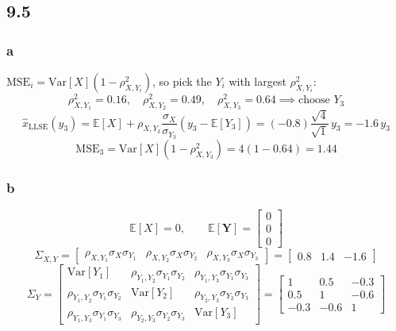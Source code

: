 \documentclass{article}
\newcommand{\mat}[1]{\begin{bmatrix}#1\end{bmatrix}}
\newcommand{\vect}[1]{\begin{bmatrix}#1\end{bmatrix}}
\newcommand{\E}[1]{\mathbb{E}\!\left[#1\right]}
\newcommand{\Var}[1]{\mathrm{Var}\!\left[#1\right]}
\begin{document}
\subsection*{9.5}

\subsubsection*{a}
$\text{MSE}_i = \Var{X}(1 - \rho_{X,Y_i}^2)$, so pick the $Y_i$ with largest $\rho_{X,Y_i}^2$:
\[
\rho_{X,Y_1}^2 = 0.16,\quad \rho_{X,Y_2}^2 = 0.49,\quad \rho_{X,Y_3}^2 = 0.64 \implies \text{choose } Y_3
\]
\[
\hat{x}_\text{LLSE}(y_3) = \E{X} + \rho_{X,Y_3}\frac{\sigma_X}{\sigma_{Y_3}}(y_3 - \E{Y_3})
= (-0.8)\frac{\sqrt{4}}{\sqrt{1}}\,y_3 = -1.6\,y_3
\]
\[
\text{MSE}_3 = \Var{X}(1 - \rho_{X,Y_3}^2) = 4(1 - 0.64) = 1.44
\]

\subsubsection*{b}
\[
\E{X} = 0,\qquad
\E{\mathbf{Y}} = \vect{0\\0\\0}
\]
\[
\Sigma_{X,Y} = \begin{bmatrix} \rho_{X,Y_1}\sigma_X\sigma_{Y_1} & \rho_{X,Y_2}\sigma_X\sigma_{Y_2} & \rho_{X,Y_3}\sigma_X\sigma_{Y_3} \end{bmatrix}
= \begin{bmatrix} 0.8 & 1.4 & -1.6 \end{bmatrix}
\]
\[
\Sigma_Y =
\mat{
\Var{Y_1} & \rho_{Y_1,Y_2}\sigma_{Y_1}\sigma_{Y_2} & \rho_{Y_1,Y_3}\sigma_{Y_1}\sigma_{Y_3} \\
\rho_{Y_1,Y_2}\sigma_{Y_1}\sigma_{Y_2} & \Var{Y_2} & \rho_{Y_2,Y_3}\sigma_{Y_2}\sigma_{Y_3} \\
\rho_{Y_1,Y_3}\sigma_{Y_1}\sigma_{Y_3} & \rho_{Y_2,Y_3}\sigma_{Y_2}\sigma_{Y_3} & \Var{Y_3}
}
=
\mat{1 & 0.5 & -0.3 \\ 0.5 & 1 & -0.6 \\ -0.3 & -0.6 & 1}
\]
\end{document}
